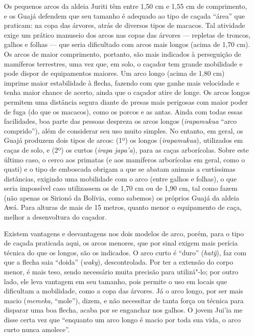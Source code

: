 Os pequenos arcos da aldeia Juriti têm entre 1,50 cm e 1,55 cm de
comprimento, e os Guajá defendem que seu tamanho é adequado ao tipo de
caçada ``área'' que praticam: na copa das árvores, atrás de diversos
tipos de macacos. Tal atividade exige um prático manuseio dos arcos nas
copas das árvores --- repletas de troncos, galhos e folhas --- que seria
dificultado com arcos mais longos (acima de 1,70 cm). Os arcos de maior
comprimento, portanto, são mais indicados à perseguição de mamíferos
terrestres, uma vez que, em solo, o caçador tem grande mobilidade e pode
dispor de equipamentos maiores. Um arco longo (acima de 1,80 cm) imprime
maior estabilidade à flecha, fazendo com que ganhe mais velocidade e
tenha maior chance de acerto, ainda que o caçador atire de longe. Os
arcos longos permitem uma distância segura diante de presas mais
perigosas com maior poder de fuga (do que os macacos), como os porcos e
as antas. Ainda com todas essas facilidades, boa parte das pessoas
despreza os arcos longos (\emph{irapamukua} ``arco comprido''), além de
considerar seu uso muito simples. No entanto, em geral, os Guajá
produzem dois tipos de arcos: (1º) os longos (\emph{irapamukua}),
utilizados em caças de solo, e (2º) os curtos (\emph{irapa japa'a}),
para as caças arborícolas. Sobre este último caso, o cerco aos primatas
(e aos mamíferos arborícolas em geral, como o quati) e o tipo de
emboscada obrigam a que se abatam animais a curtíssimas distâncias,
exigindo uma mobilidade com o arco (entre galhos e folhas), o que seria
impossível caso utilizassem os de 1,70 cm ou de 1,90 cm, tal como fazem
(não apenas os Sirionó da Bolívia, como sabemos) os próprios Guajá da
aldeia Awá. Para alturas de mais de 15 metros, quanto menor o
equipamento de caça, melhor a desenvoltura do caçador.

Existem vantagens e desvantagens nos dois modelos de arco, porém, para o
tipo de caçada praticada aqui, os arcos menores, que por sinal exigem
mais perícia técnica do que os longos, são os indicados. O arco curto é
``duro'' (\emph{hatỹ}), faz com que a flecha saia ``doida'' (\emph{waky}),
descontrolada. Por ter a extensão do corpo menor, é mais teso, sendo
necessário muita precisão para utilizá"-lo; por outro lado, ele leva
vantagem em seu tamanho, pois permite o uso em locais que dificultam a
mobilidade, como a copa das árvores. Já o arco longo, por ser mais macio
(\emph{memeka}, ``mole''), dizem, e não necessitar de tanta força ou
técnica para disparar uma boa flecha, acaba por se enganchar nos galhos.
O jovem Jui'ia me disse certa vez que ``enquanto um arco longo é macio
por toda sua vida, o arco curto nunca amolece''.

